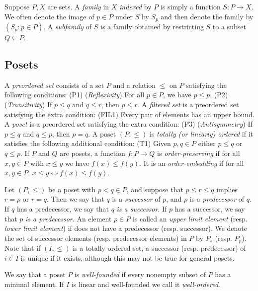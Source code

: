 \documentclass[oneside,11pt]{amsart}
\theoremstyle{definition}
\newtheorem{proof techniques}{Proof Techniques}
\begin{document}
Suppose $P , X$ are sets. A \emph{family} in $X$ \emph{indexed} by $P$ is simply a function $S : P \to X$. We often denote the image of $p \in P$ under $S$ by $S_p$ and then denote the family by $(S_p : p \in P )$. A \emph{subfamily} of $S$ is a family obtained by restricting $S$ to a subset $Q \subseteq P$. 





\subsection{Posets} 

A \emph{preordered set} consists of a set $P$ and a relation $\leq$ on $P$ satisfying the following conditions: (P1) (\emph{Reflexivity}) For all $p \in P$, we have $p \leq p$, (P2) (\emph{Transitivity}) If $p \leq q$ and $q \leq r$, then $p \leq r$. A \emph{filtered set} is a preordered set satisfying the extra condition: (FIL1) Every pair of elements has an upper bound. A \emph{poset} is a preordered set satisfying the extra condition: (P3) (\emph{Antisymmetry}) If $p \leq q$ and $q \leq p$, then $p = q$. A poset $(P , \leq)$ is \emph{totally (or linearly) ordered} if it satisfies the following additional condition: (T1) Given $p , q \in P$ either $p \leq q$ or $q \leq p$. If $P$ and $Q$ are posets, a function $f: P \to Q$ is \emph{order-preserving} if for all $x , y \in P$ with $x \leq y$ we have $f(x) \leq f(y)$. It is an \emph{order-embedding} if for all $x , y \in P$, $x \leq y \iff f(x) \leq f(y)$. 

Let $(P , \leq)$ be a poset with $p < q \in P$, and suppose that $p \leq r \leq q$ implies $r = p$ or $r = q$. Then we say that $q$ is a \emph{successor} of $p$, and $p$ is a \emph{predecessor} of $q$. If $q$ has a predecessor, we say that $q$ \emph{is a successor}. If $p$ has a successor, we say that $p$ \emph{is a predecessor}. An element $p \in P$ is called an \emph{upper limit element} (resp. \emph{lower limit element}) if does not have a predecessor (resp. successor). We denote the set of successor elements (resp. predecessor elements) in $P$ by $P_s$ (resp. $P_p$). Note that if $(I , \leq)$ is a totally ordered set, a successor (resp. predecessor) of $i \in I$ is unique if it exists, although this may not be true for general posets. 

We say that a poset $P$ is \emph{well-founded} if every nonempty subset of $P$ has a minimal element. If $I$ is linear and well-founded we call it \emph{well-ordered}.
\end{document}
